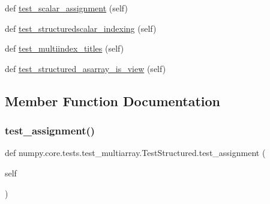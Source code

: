 \begin{DoxyCompactItemize}
def \hyperlink{classnumpy_1_1core_1_1tests_1_1test__multiarray_1_1TestStructured_a4a3fbc04314f0a27fabb6b6ed4823dcf}{test\+\_\+scalar\+\_\+assignment} (self)
\item 
def \hyperlink{classnumpy_1_1core_1_1tests_1_1test__multiarray_1_1TestStructured_a6a155ab87d22bfbff8f04b2ec0ace29a}{test\+\_\+structuredscalar\+\_\+indexing} (self)
\item 
def \hyperlink{classnumpy_1_1core_1_1tests_1_1test__multiarray_1_1TestStructured_a6ecdcadb5776ad2b2c9340424738a3c5}{test\+\_\+multiindex\+\_\+titles} (self)
\item 
def \hyperlink{classnumpy_1_1core_1_1tests_1_1test__multiarray_1_1TestStructured_a10f5984f4f4141d1d9cfc9f96443b5cb}{test\+\_\+structured\+\_\+asarray\+\_\+is\+\_\+view} (self)
\end{DoxyCompactItemize}


\subsection{Member Function Documentation}
\mbox{\label{classnumpy_1_1core_1_1tests_1_1test__multiarray_1_1TestStructured_a340e8380d2671b4ef21739bc244ee8f8}} 
\subsubsection{\texorpdfstring{test\+\_\+assignment()}{test\_assignment()}}
{\footnotesize\ttfamily def numpy.\+core.\+tests.\+test\+\_\+multiarray.\+Test\+Structured.\+test\+\_\+assignment (\begin{DoxyParamCaption}\item[{}]{self }\end{DoxyParamCaption})}

\mbox{\label{classnumpy_1_1core_1_1tests_1_1test__multiarray_1_1TestStructured_affa9de00af48d14d4fa0736f7ddb543f}} 
